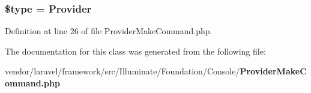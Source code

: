 \subsubsection[{\$type}]{\setlength{\rightskip}{0pt plus 5cm}\$type = \textquotesingle{}Provider\textquotesingle{}\hspace{0.3cm}{\ttfamily [protected]}}\label{class_illuminate_1_1_foundation_1_1_console_1_1_provider_make_command_a9a4a6fba2208984cabb3afacadf33919}


Definition at line 26 of file Provider\+Make\+Command.\+php.



The documentation for this class was generated from the following file\+:\begin{DoxyCompactItemize}
\item 
vendor/laravel/framework/src/\+Illuminate/\+Foundation/\+Console/{\bf Provider\+Make\+Command.\+php}\end{DoxyCompactItemize}
